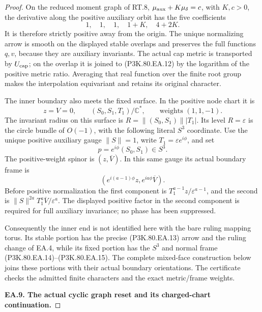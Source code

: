 \begin{proof}
On the reduced moment graph of RT.8,
\(\mu_{\rm aux}+K\mu_\delta=c\), with \(K,c>0\), the derivative
along the positive auxiliary orbit has the five coefficients
\[
             1,\quad1,\quad1,\quad1+K,\quad4+2K.
\]
It is therefore strictly positive away from the origin. The unique
normalizing arrow is smooth on the displayed stable overlaps and
preserves the full functions \(q,v\), because they are auxiliary
invariants. The actual cap metric is transported by \(U_{\rm cap}\);
on the overlap it is joined to (P3K.80.EA.12) by the logarithm of the positive
metric ratio. Averaging that real function over the finite root group
makes the interpolation equivariant and retains its original character.

The inner boundary also meets the fixed surface. In the positive node
chart it is
\[
 z=V=0,\qquad (S_0,S_1,T_1)/\mathbb C^*,
 \qquad \text{weights }(1,1,-1).
\]
The invariant radius on this surface is
\(R=\|(S_0,S_1)\||T_1|\). Its level \(R=\varepsilon\) is the
circle bundle of \(O(-1)\), with the following literal \(S^3\)
coordinate. Use the unique positive auxiliary gauge \(\|S\|=1\),
write \(T_1=\varepsilon e^{i\phi}\), and set
\[
                  p=e^{i\phi}(S_0,S_1)\in S^3.
 \tag{P3K.80.EA.14}
\]
The positive-weight spinor is \((z,\overline V)\). In this same
gauge its actual boundary frame is
\[
 \left(e^{i(a-1)\phi}z,e^{ia\phi}\overline V\right).
 \tag{P3K.80.EA.15}
\]
Before positive normalization the first component is
\(T_1^{a-1}z/\varepsilon^{a-1}\), and the second is
\(\|S\|^{2a}T_1^a\overline V/\varepsilon^a\).
The displayed positive factor in the second component is required for
full auxiliary invariance; no phase has been suppressed.

Consequently the inner end is not identified here with the bare ruling
mapping torus. Its stable portion has the precise (P3K.80.EA.13) arrow and
the ruling change of EA.4, while its fixed portion has the \(S^3\)
and normal frame (P3K.80.EA.14)--(P3K.80.EA.15). The complete mixed-face construction below joins these portions with their actual boundary orientations.
The certificate 
checks the admitted finite characters and the exact metric/frame weights.

\par\medskip\noindent\textbf{EA.9. The actual cyclic graph reset and its charged-chart continuation.}\par\nopagebreak[4]


\end{proof}
